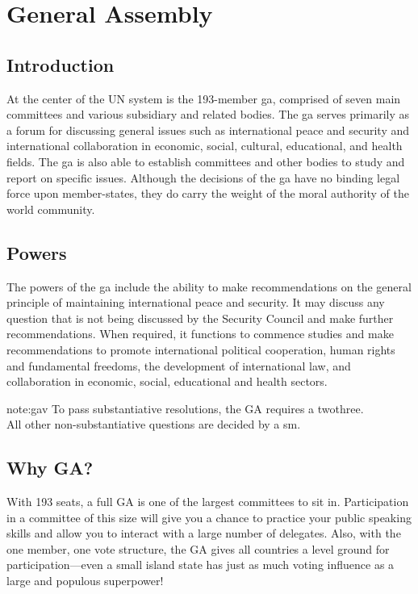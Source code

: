 \chapter{General Assembly}
\section{Introduction}
At the center of the UN system is the 193-member 
\acrfull{ga}, comprised of seven main committees and various 
subsidiary and related bodies. The \acrshort{ga} serves primarily as a forum for discussing general issues such as international peace and security and international collaboration in economic, social, cultural, educational, and health fields. The \acrshort{ga} is also able to establish committees and other bodies to study and report on specific issues. Although the decisions of the \acrshort{ga} have no binding legal force upon member-states, they do carry the weight of the moral authority of the world community.

\section{Powers}
The powers of the \acrshort{ga} include the ability to make 
recommendations on the general principle of maintaining 
international peace and security. It may discuss any question that 
is not being discussed by the Security Council and make further 
recommendations. When required, it functions to commence 
studies and make recommendations to promote international 
political cooperation, human rights and fundamental freedoms, 
the development of international law, and collaboration in 
economic, social, educational and health sectors.
\begin{note}[GA Voting]{note:gav}
To pass substantiative resolutions, the GA requires a \gls{twothree}. \\
All other non-substantiative questions are decided by a \gls{sm}.
\end{note}
\section{Why GA?}
With 193 seats, a full GA is one of the largest 
committees to sit in. Participation in a committee of this size 
will give you a chance to practice your public speaking skills and 
allow you to interact with a large number of delegates. Also, with 
the one member, one vote structure, the GA gives all countries a 
level ground for participation—even a small island state has just 
as much voting influence as a large and populous superpower!

